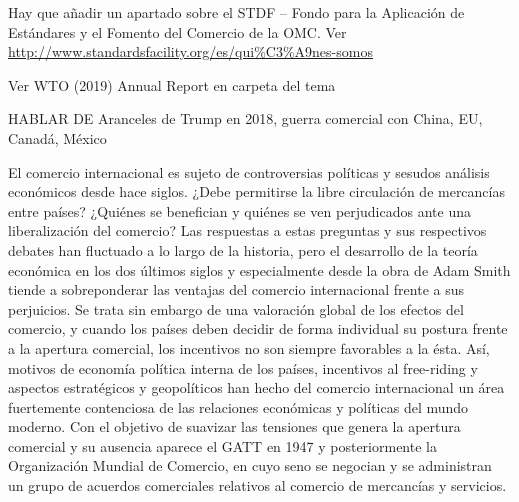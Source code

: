 \documentclass{nuevotema}
\begin{document}
\ideaclave

Hay que añadir un apartado sobre el STDF -- Fondo para la Aplicación de Estándares y el Fomento del Comercio de la OMC. Ver \url{http://www.standardsfacility.org/es/qui\%C3\%A9nes-somos}

Ver WTO (2019) Annual Report en carpeta del tema

HABLAR DE Aranceles de Trump en 2018, guerra comercial con China, EU, Canadá, México

El comercio internacional es sujeto de controversias políticas y sesudos análisis económicos desde hace siglos. ¿Debe permitirse la libre circulación de mercancías entre países? ¿Quiénes se benefician y quiénes se ven perjudicados ante una liberalización del comercio? Las respuestas a estas preguntas y sus respectivos debates han fluctuado a lo largo de la historia, pero el desarrollo de la teoría económica en los dos últimos siglos y especialmente desde la obra de Adam Smith tiende a sobreponderar las ventajas del comercio internacional frente a sus perjuicios. Se trata sin embargo de una valoración global de los efectos del comercio, y cuando los países deben decidir de forma individual su postura frente a la apertura comercial, los incentivos no son siempre favorables a la ésta. Así, motivos de economía política interna de los países, incentivos al free-riding y aspectos estratégicos y geopolíticos han hecho del comercio internacional un área fuertemente contenciosa de las relaciones económicas y políticas del mundo moderno. Con el objetivo de suavizar las tensiones que genera la apertura comercial y su ausencia aparece el GATT en 1947 y posteriormente la Organización Mundial de Comercio, en cuyo seno se negocian y se administran un grupo de acuerdos comerciales relativos al comercio de mercancías y servicios. 
\end{document}
